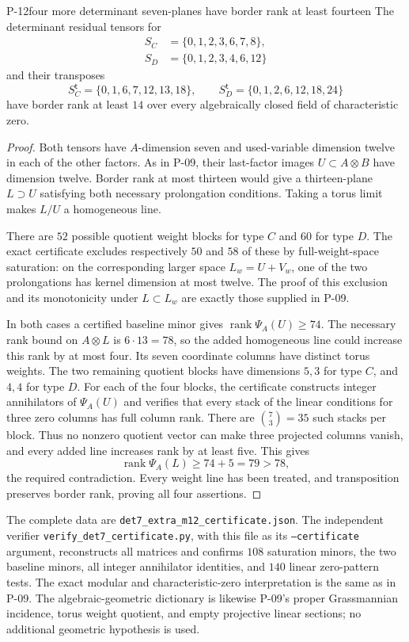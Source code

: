 
\begin{finding}{P-12}{four more determinant seven-planes have border rank at least fourteen}
The determinant residual tensors for
\[
 \begin{split}
 S_C&=\{0,1,2,3,6,7,8\},\\
 S_D&=\{0,1,2,3,4,6,12\}
 \end{split}
\]
and their transposes
\[
 S_C^{\mathsf t}=\{0,1,6,7,12,13,18\},\qquad
 S_D^{\mathsf t}=\{0,1,2,6,12,18,24\}
\]
have border rank at least \(14\) over every algebraically
closed field of characteristic zero.
\end{finding}
\begin{proof}
Both tensors have \(A\)-dimension seven and used-variable
dimension twelve in each of the other factors. As in P-09,
their last-factor images \(U\subset A\otimes B\) have
dimension twelve. Border rank at most thirteen would give
a thirteen-plane \(L\supset U\) satisfying both necessary
prolongation conditions. Taking a torus limit makes
\(L/U\) a homogeneous line.

There are \(52\) possible quotient weight blocks for
type \(C\) and \(60\) for type \(D\). The exact certificate
excludes respectively \(50\) and \(58\) of these by
full-weight-space saturation: on the corresponding
larger space \(L_w=U+V_w\), one of the two prolongations
has kernel dimension at most twelve. The proof of this
exclusion and its monotonicity under \(L\subset L_w\)
are exactly those supplied in P-09.

In both cases a certified baseline minor gives
\(\operatorname{rank}\Psi_A(U)\geq74\). The necessary
rank bound on \(A\otimes L\) is \(6\cdot13=78\), so
the added homogeneous line could increase this rank
by at most four. Its seven coordinate columns have
distinct torus weights. The two remaining quotient
blocks have dimensions \(5,3\) for type \(C\), and
\(4,4\) for type \(D\). For each of the four blocks,
the certificate constructs integer annihilators of
\(\Psi_A(U)\) and verifies that every stack of the
linear conditions for three zero columns has full
column rank. There are \(\binom73=35\) such stacks
per block. Thus no nonzero quotient vector can make
three projected columns vanish, and every added line
increases rank by at least five. This gives
\[
 \operatorname{rank}\Psi_A(L)\geq74+5=79>78,
 \]
the required contradiction.
Every weight line has been treated, and transposition
preserves border rank, proving all four assertions.
\end{proof}

The complete data are
\texttt{det7\_extra\_m12\_certificate.json}.
The independent verifier
\texttt{verify\_det7\_certificate.py}, with this file as
its \texttt{--certificate} argument, reconstructs all
matrices and confirms \(108\) saturation minors,
the two baseline minors, all integer annihilator
identities, and \(140\) linear zero-pattern tests.
The exact modular and characteristic-zero interpretation
is the same as in P-09. The algebraic-geometric dictionary
is likewise P-09's proper Grassmannian incidence,
torus weight quotient, and empty projective linear
sections; no additional geometric hypothesis is used.
